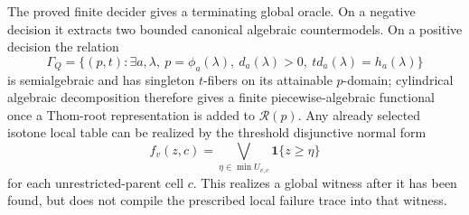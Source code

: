 The proved finite decider gives a terminating global oracle.  On a negative decision it extracts two bounded canonical algebraic countermodels.  On a positive decision the relation
\[
 \Gamma_Q=\{(p,t):\exists a,\lambda,\ p=\phi_a(\lambda),\ d_a(\lambda)>0,\ t d_a(\lambda)=h_a(\lambda)\}
\]
is semialgebraic and has singleton \(t\)-fibers on its attainable \(p\)-domain; cylindrical algebraic decomposition therefore gives a finite piecewise-algebraic functional once a Thom-root representation is added to \(\mathcal R(p)\).  Any already selected isotone local table can be realized by the threshold disjunctive normal form
\[
 f_v(z,c)=\bigvee_{\eta\in\min U_{v,c}}\mathbf 1\{z\geq\eta\}
\]
for each unrestricted-parent cell \(c\).  This realizes a global witness after it has been found, but does not compile the prescribed local failure trace into that witness.